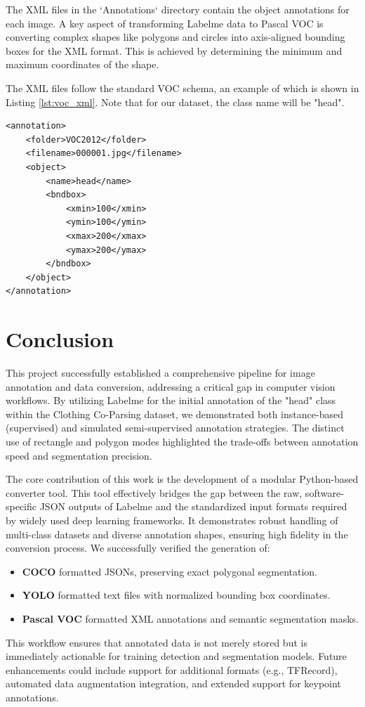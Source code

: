 \documentclass[conference]{IEEEtran}
\begin{document}
The XML files in the `Annotations` directory contain the object annotations
for each image. A key aspect of transforming Labelme data to Pascal VOC is
converting complex shapes like polygons and circles into axis-aligned bounding
boxes for the XML format. This is achieved by determining the minimum and
maximum coordinates of the shape.

The XML files follow the standard VOC schema, an example of which is shown
in Listing \ref{lst:voc_xml}. Note that for our dataset, the class name will
be "head".

\begin{lstlisting}[style=json, caption={Example Pascal VOC XML annotation file}, label={lst:voc_xml}]
<annotation>
    <folder>VOC2012</folder>
    <filename>000001.jpg</filename>
    <object>
        <name>head</name>
        <bndbox>
            <xmin>100</xmin>
            <ymin>100</ymin>
            <xmax>200</xmax>
            <ymax>200</ymax>
        </bndbox>
    </object>
</annotation>
\end{lstlisting}

\section{Conclusion}

This project successfully established a comprehensive pipeline for image
annotation and data conversion, addressing a critical gap in computer vision
workflows. By utilizing Labelme for the initial annotation of the "head" class
within the Clothing Co-Parsing dataset, we demonstrated both instance-based
(supervised) and simulated semi-supervised annotation strategies. The distinct
use of rectangle and polygon modes highlighted the trade-offs between
annotation speed and segmentation precision.

The core contribution of this work is the development of a modular Python-based
converter tool. This tool effectively bridges the gap between the raw,
software-specific JSON outputs of Labelme and the standardized input formats
required by widely used deep learning frameworks. It demonstrates robust
handling of multi-class datasets and diverse annotation shapes, ensuring high
fidelity in the conversion process. We successfully verified the generation of:

\begin{itemize}
    \item \textbf{COCO} formatted JSONs, preserving exact polygonal segmentation.
    \item \textbf{YOLO} formatted text files with normalized bounding box coordinates.
    \item \textbf{Pascal VOC} formatted XML annotations and semantic segmentation masks.
\end{itemize}

This workflow ensures that annotated data is not merely stored but is
immediately actionable for training detection and segmentation models. Future
enhancements could include support for additional formats (e.g., TFRecord),
automated data augmentation integration, and extended support for keypoint
annotations.
\end{document}
